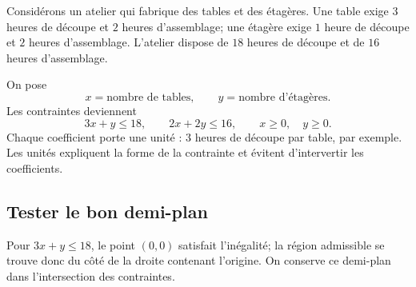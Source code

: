Considérons un atelier qui fabrique des tables et des étagères. Une table exige $3$ heures de découpe et $2$ heures d'assemblage; une étagère exige $1$ heure de découpe et $2$ heures d'assemblage. L'atelier dispose de $18$ heures de découpe et de $16$ heures d'assemblage.

On pose
\[
x=\text{nombre de tables},
\qquad
y=\text{nombre d'étagères}.
\]
Les contraintes deviennent
\[
3x+y\le18,
\qquad
2x+2y\le16,
\qquad
x\ge0,
\quad y\ge0.
\]
Chaque coefficient porte une unité : $3$ heures de découpe par table, par exemple. Les unités expliquent la forme de la contrainte et évitent d'intervertir les coefficients.

\subsection{Tester le bon demi-plan}
Pour $3x+y\le18$, le point $(0,0)$ satisfait l'inégalité; la région admissible se trouve donc du côté de la droite contenant l'origine. On conserve ce demi-plan dans l'intersection des contraintes.

\begin{center}
\end{center}

